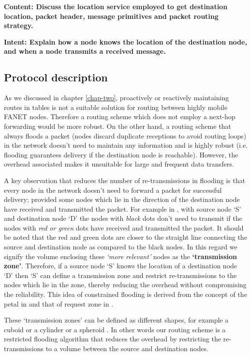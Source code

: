 \textbf{Content: Discuss the location service employed to get destination location, packet header, message primitives and packet routing strategy.}

\textbf{Intent: Explain how a node knows the location of the destination node, and when a node transmits a received message.
}

\subsection{Protocol description} 
\label{protocol_description}

As we discussed in chapter \ref{chap-two}, proactively or reactively maintaining routes in tables is not a suitable solution for routing between highly mobile FANET nodes. Therefore a routing scheme which does not employ a next-hop forwarding would be more robust. On the other hand, a routing scheme that always floods a packet (nodes discard duplicate receptions to avoid routing loops) in the network doesn't need to maintain any information and is highly robust (i.e. flooding guarantees delivery if the destination node is reachable). However, the overhead associated makes it unsuitable for large and frequent data transfers. 

 A key observation that reduces the number of re-transmissions in flooding is that every node in the network doesn't need to forward a packet for successful delivery; provided some nodes which lie in the direction of the destination node have received and transmitted the packet. For example in \fref{}, with source node `S' and destination node `D' the nodes with \emph{black} dots don't need to transmit if the nodes with \emph{red or green} dots have received and transmitted the packet. It should be noted that the red and green dots are closer to the straight line connecting the source and destination node as compared to the black nodes. In this regard we signify the volume enclosing these \emph{`more relevant'} nodes as the \textbf{`transmission zone'}. Therefore, if a source node `S' knows the location of a destination node `D' then `S' can define a transmission zone and restrict re-transmissions to the nodes which lie in the zone, thereby reducing the overhead without compromising the reliability. This idea of constrained flooding is derived from the concept of the petal in \cite{6133499} and that of request zone in \cite{Ko:1998:LRM:288235.288252}. 

These `transmission zones' can be defined as different shapes, for example a cuboid or a cylinder or a spheroid \fref{}. In other words our routing scheme is a restricted flooding algorithm that reduces the overhead by restricting the re-transmissions to a volume between the source and destination nodes. 

